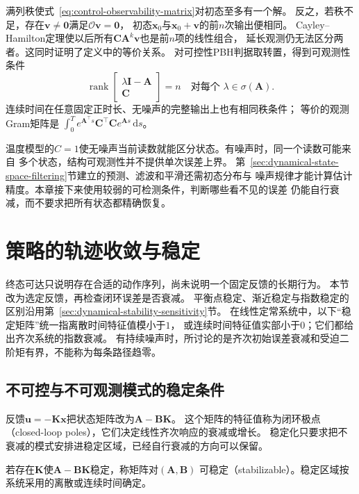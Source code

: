 满列秩使式~\eqref{eq:control-observability-matrix}对初态至多有一个解。
反之，若秩不足，存在$\bm v\neq\bm0$满足$\mathcal O\bm v=\bm0$，
初态$\bm x_0$与$\bm x_0+\bm v$的前$n$次输出便相同。
Cayley--Hamilton定理使以后所有$\bm C\bm A^k\bm v$也是前$n$项的线性组合，
延长观测仍无法区分两者。这同时证明了定义中的等价关系。
对可控性PBH判据取转置，得到可观测性条件
\begin{equation}
  \operatorname{rank}\begin{bmatrix}\lambda\bm I-\bm A\\\bm C\end{bmatrix}=n
  \quad\text{对每个 }\lambda\in\sigma(\bm A).
  \label{eq:control-pbh-observability}
\end{equation}
连续时间在任意固定正时长、无噪声的完整输出上也有相同秩条件；
等价的观测Gram矩阵是
$\int_0^T e^{\bm A^\top s}\bm C^\top\bm C e^{\bm A s}\,\mathrm ds$。

温度模型的$C=1$使无噪声当前读数就能区分状态。有噪声时，同一个读数可能来自
多个状态，结构可观测性并不提供单次误差上界。
第~\ref{sec:dynamical-state-space-filtering}节建立的预测、滤波和平滑还需初态分布与
噪声规律才能计算估计精度。本章接下来使用较弱的可检测条件，判断哪些看不见的误差
仍能自行衰减，而不要求把所有状态都精确恢复。

\section{策略的轨迹收敛与稳定}
\label{sec:control-closed-loop-stability}

终态可达只说明存在合适的动作序列，尚未说明一个固定反馈的长期行为。
本节改为选定反馈，再检查闭环误差是否衰减。
平衡点稳定、渐近稳定与指数稳定的区别沿用第~\ref{sec:dynamical-stability-sensitivity}节。
在线性定常系统中，以下“稳定矩阵”统一指离散时间特征值模小于$1$，
或连续时间特征值实部小于$0$；它们都给出齐次系统的指数衰减。
有持续噪声时，所讨论的是齐次初始误差衰减和受迫二阶矩有界，不能称为每条路径趋零。

\subsection{不可控与不可观测模式的稳定条件}
反馈$\bm u=-\bm K\bm x$把状态矩阵改为$\bm A-\bm B\bm K$。
这个矩阵的特征值称为闭环极点（closed-loop poles），它们决定线性齐次响应的衰减或增长。
稳定化只要求把不衰减的模式安排进稳定区域，已经自行衰减的方向可以保留。
\begin{definition}[可稳定性]
\label{def:control-stabilizability}
若存在$\bm K$使$\bm A-\bm B\bm K$稳定，称矩阵对$(\bm A,\bm B)$
可稳定（stabilizable）。稳定区域按系统采用的离散或连续时间确定。
\end{definition}

